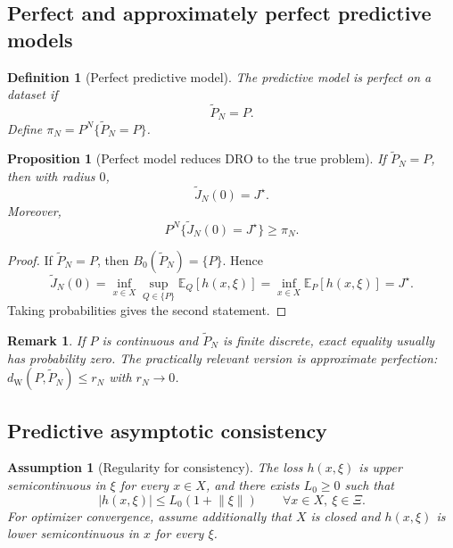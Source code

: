 \documentclass[11pt]{article}
\newtheorem{proposition}[theorem]{Proposition}
\newtheorem{assumption}[theorem]{Assumption}
\newtheorem{definition}[theorem]{Definition}
\newtheorem{remark}[theorem]{Remark}
\newcommand{\E}{\mathbb{E}}
\newcommand{\XiSet}{\Xi}
\newcommand{\1}{\mathbf{1}}
\newcommand{\dW}{d_{\mathrm W}}
\newcommand{\Ptil}{\widetilde P_N}
\newcommand{\norm}[1]{\left\lVert #1\right\rVert}
\begin{document}
\subsection{Perfect and approximately perfect predictive models}

\begin{definition}[Perfect predictive model]
The predictive model is perfect on a dataset if
\begin{equation}
    \Ptil=P.
\end{equation}
Define $\pi_N=P^N\{\Ptil=P\}$.
\end{definition}

\begin{proposition}[Perfect model reduces DRO to the true problem]\label{prop:perfect}
If $\Ptil=P$, then with radius $0$,
\begin{equation}
    \widetilde J_N(0)=J^\star.
\end{equation}
Moreover,
\begin{equation}
    P^N\{\widetilde J_N(0)=J^\star\}\ge\pi_N.
\end{equation}
\end{proposition}

\begin{proof}
If $\Ptil=P$, then $B_0(\Ptil)=\{P\}$. Hence
\begin{equation*}
\widetilde J_N(0)=\inf_{x\in X}\sup_{Q\in\{P\}}\E_Q[h(x,\xi)]
=\inf_{x\in X}\E_P[h(x,\xi)]=J^\star.
\end{equation*}
Taking probabilities gives the second statement.
\end{proof}

\begin{remark}
If $P$ is continuous and $\Ptil$ is finite discrete, exact equality usually has probability zero. The practically relevant version is approximate perfection: $\dW(P,\Ptil)\le r_N$ with $r_N\to0$.
\end{remark}

\subsection{Predictive asymptotic consistency}

\begin{assumption}[Regularity for consistency]\label{ass:regularity}
The loss $h(x,\xi)$ is upper semicontinuous in $\xi$ for every $x\in X$, and there exists $L_0\ge0$ such that
\begin{equation}
    |h(x,\xi)|\le L_0(1+\norm{\xi})
    \qquad \forall x\in X,\ \xi\in\XiSet.
\end{equation}
For optimizer convergence, assume additionally that $X$ is closed and $h(x,\xi)$ is lower semicontinuous in $x$ for every $\xi$.
\end{assumption}
\end{document}
